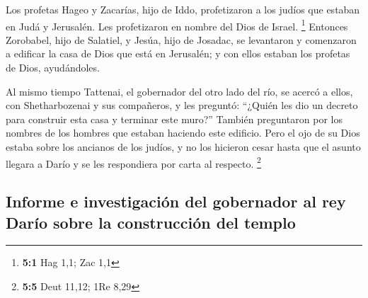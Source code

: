  Los profetas Hageo y Zacarías, hijo de Iddo, profetizaron
a los judíos que estaban en Judá y Jerusalén. Les profetizaron en nombre
del Dios de Israel. \footnote{\textbf{5:1} Hag 1,1; Zac 1,1}
 Entonces Zorobabel, hijo de Salatiel, y Jesúa, hijo de
Josadac, se levantaron y comenzaron a edificar la casa de Dios que está
en Jerusalén; y con ellos estaban los profetas de Dios, ayudándoles.

 Al mismo tiempo Tattenai, el gobernador del otro lado del
río, se acercó a ellos, con Shetharbozenai y sus compañeros, y les
preguntó: ``¿Quién les dio un decreto para construir esta casa y
terminar este muro?''  También preguntaron por los nombres
de los hombres que estaban haciendo este edificio.  Pero
el ojo de su Dios estaba sobre los ancianos de los judíos, y no los
hicieron cesar hasta que el asunto llegara a Darío y se les respondiera
por carta al respecto. \footnote{\textbf{5:5} Deut 11,12; 1Re 8,29}

\hypertarget{informe-e-investigaciuxf3n-del-gobernador-al-rey-daruxedo-sobre-la-construcciuxf3n-del-templo}{%
\subsection{Informe e investigación del gobernador al rey Darío sobre la
construcción del
templo}\label{informe-e-investigaciuxf3n-del-gobernador-al-rey-daruxedo-sobre-la-construcciuxf3n-del-templo}}

